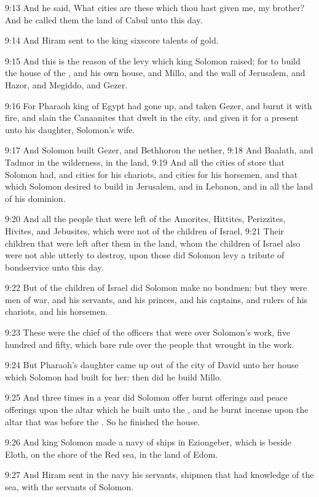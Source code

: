 9:13 And he said, What cities are these which thou hast given me, my brother? And he called them the land of Cabul unto this day.

9:14 And Hiram sent to the king sixscore talents of gold.

9:15 And this is the reason of the levy which king Solomon raised; for to build the house of the \LORD, and his own house, and Millo, and the wall of Jerusalem, and Hazor, and Megiddo, and Gezer.

9:16 For Pharaoh king of Egypt had gone up, and taken Gezer, and burnt it with fire, and slain the Canaanites that dwelt in the city, and given it for a present unto his daughter, Solomon's wife.

9:17 And Solomon built Gezer, and Bethhoron the nether, 9:18 And Baalath, and Tadmor in the wilderness, in the land, 9:19 And all the cities of store that Solomon had, and cities for his chariots, and cities for his horsemen, and that which Solomon desired to build in Jerusalem, and in Lebanon, and in all the land of his dominion.

9:20 And all the people that were left of the Amorites, Hittites, Perizzites, Hivites, and Jebusites, which were not of the children of Israel, 9:21 Their children that were left after them in the land, whom the children of Israel also were not able utterly to destroy, upon those did Solomon levy a tribute of bondservice unto this day.

9:22 But of the children of Israel did Solomon make no bondmen: but they were men of war, and his servants, and his princes, and his captains, and rulers of his chariots, and his horsemen.

9:23 These were the chief of the officers that were over Solomon's work, five hundred and fifty, which bare rule over the people that wrought in the work.

9:24 But Pharaoh's daughter came up out of the city of David unto her house which Solomon had built for her: then did he build Millo.

9:25 And three times in a year did Solomon offer burnt offerings and peace offerings upon the altar which he built unto the \LORD, and he burnt incense upon the altar that was before the \LORD. So he finished the house.

9:26 And king Solomon made a navy of ships in Eziongeber, which is beside Eloth, on the shore of the Red sea, in the land of Edom.

9:27 And Hiram sent in the navy his servants, shipmen that had knowledge of the sea, with the servants of Solomon.

